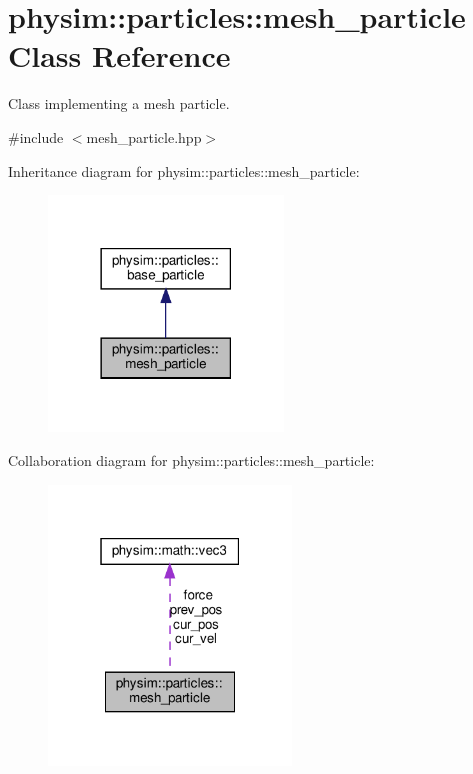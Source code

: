 \hypertarget{classphysim_1_1particles_1_1mesh__particle}{}\section{physim\+:\+:particles\+:\+:mesh\+\_\+particle Class Reference}
\label{classphysim_1_1particles_1_1mesh__particle}


Class implementing a mesh particle.  




{\ttfamily \#include $<$mesh\+\_\+particle.\+hpp$>$}



Inheritance diagram for physim\+:\+:particles\+:\+:mesh\+\_\+particle\+:\nopagebreak
\begin{figure}[H]
\begin{center}
\leavevmode
\includegraphics[width=177pt]{classphysim_1_1particles_1_1mesh__particle__inherit__graph}
\end{center}
\end{figure}


Collaboration diagram for physim\+:\+:particles\+:\+:mesh\+\_\+particle\+:\nopagebreak
\begin{figure}[H]
\begin{center}
\leavevmode
\includegraphics[width=183pt]{classphysim_1_1particles_1_1mesh__particle__coll__graph}
\end{center}
\end{figure}
